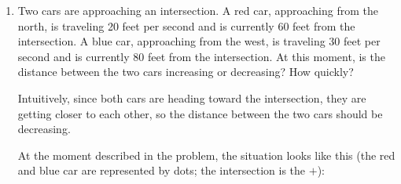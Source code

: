 \documentclass[main]{subfiles}
\begin{document}
\begin{enumerate}[resume]

\item 


    \begin{problem}[\nstretch{3}]
      Two cars are approaching an intersection. A red car, approaching
      from the north, is traveling 20 feet per second and is currently 60
      feet from the intersection. A blue car, approaching from the west,
      is traveling 30 feet per second and is currently 80 feet from the
      intersection.  At this moment, is the distance between the two cars
      increasing or decreasing?  How quickly?
    \end{problem}

    \begin{solution}
      Intuitively, since both cars are heading toward the intersection,
      they are getting closer to each other, so the distance between the
      two cars should be decreasing.

      At the moment described in the problem, the situation looks like
      this (the red and blue car are represented by dots; the intersection
      is the $+$):
      \begin{center}


\end{center}
\end{solution}
\end{enumerate}
\end{document}
